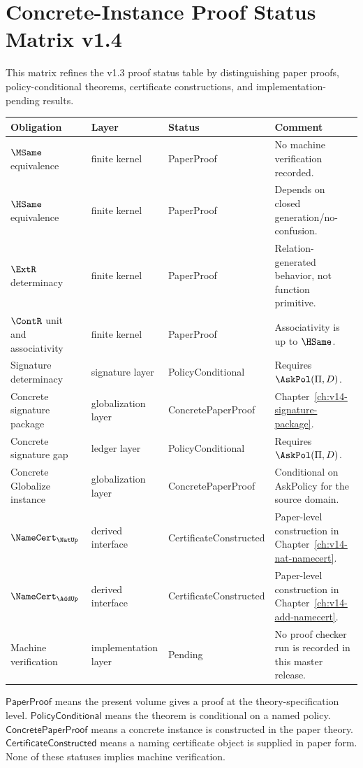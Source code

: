 \chapter{Concrete-Instance Proof Status Matrix v1.4}
\label{ch:v14-status-matrix}

This matrix refines the v1.3 proof status table by distinguishing paper proofs, policy-conditional theorems, certificate constructions, and implementation-pending results.

\begin{longtable}{p{}p{}p{}p{}}
\toprule
\textbf{Obligation} & \textbf{Layer} & \textbf{Status} & \textbf{Comment}\\
\midrule
\(\MSame\) equivalence & finite kernel & PaperProof & No machine verification recorded.\\
\(\HSame\) equivalence & finite kernel & PaperProof & Depends on closed generation/no-confusion.\\
\(\ExtR\) determinacy & finite kernel & PaperProof & Relation-generated behavior, not function primitive.\\
\(\ContR\) unit and associativity & finite kernel & PaperProof & Associativity is up to \(\HSame\).\\
Signature determinacy & signature layer & PolicyConditional & Requires \(\AskPol(\Pi,D)\).\\
Concrete signature package & globalization layer & ConcretePaperProof & Chapter~\ref{ch:v14-signature-package}.\\
Concrete signature gap & ledger layer & PolicyConditional & Requires \(\AskPol(\Pi,D)\).\\
Concrete Globalize instance & globalization layer & ConcretePaperProof & Conditional on AskPolicy for the source domain.\\
\(\NameCert_{\NatUp}\) & derived interface & CertificateConstructed & Paper-level construction in Chapter~\ref{ch:v14-nat-namecert}.\\
\(\NameCert_{\AddUp}\) & derived interface & CertificateConstructed & Paper-level construction in Chapter~\ref{ch:v14-add-namecert}.\\
Machine verification & implementation layer & Pending & No proof checker run is recorded in this master release.\\
\bottomrule
\end{longtable}

\begin{remark}
\(
\textsf{PaperProof}
\) means the present volume gives a proof at the theory-specification level. \(
\textsf{PolicyConditional}
\) means the theorem is conditional on a named policy. \(
\textsf{ConcretePaperProof}
\) means a concrete instance is constructed in the paper theory. \(
\textsf{CertificateConstructed}
\) means a naming certificate object is supplied in paper form. None of these statuses implies machine verification.
\end{remark}
